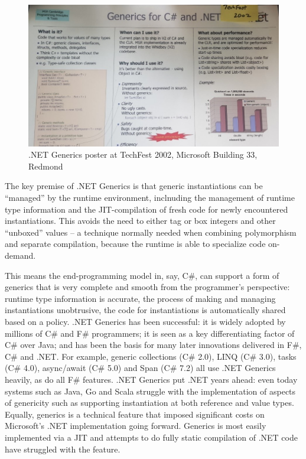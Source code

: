 \documentclass[acmsmall]{acmart}\settopmatter{}
\begin{document}
\begin{figure}

  \includegraphics[width=0.8\linewidth]{fig1.jpg}
  \caption{.NET Generics poster at TechFest 2002, Microsoft Building 33, Redmond}
  \label{fig:fig1}

\end{figure}

The key premise of .NET Generics is that generic instantiations can be “managed” by the runtime environment, inclnuding the management of runtime type information
and the JIT-compilation of fresh code for newly encountered instantiations.  This avoids the need to either tag or box integers and other “unboxed” values – a technique
normally needed when combining polymorphism and separate compilation, because the runtime is able to specialize code on-demand.

This means the end-programming model in, say, C\#, can support a form of generics that is very complete and smooth from the programmer’s perspective:
runtime type information is accurate, the process of making and managing instantiations unobtrusive, the code for instantiations is automatically shared based on a
policy. .NET Generics has been successful: it is widely adopted by millions of C\# and F\# programmers; it is seen as a key differentiating factor of C\# over Java; and
has been the basis for many later innovations delivered in F\#, C\# and .NET. For example, generic collections (C\# 2.0), LINQ (C\# 3.0), tasks (C\# 4.0),
async/await (C\# 5.0) and Span (C\# 7.2) all use .NET Generics heavily, as do all F\# features. .NET Generics put .NET years ahead: even today systems such as
Java, Go and Scala struggle with the implementation of aspects of genericity such as supporting instantiation at both reference and value types.  Equally, generics is
a technical feature that imposed significant costs on Microsoft’s .NET implementation going forward. Generics is most easily implemented via a JIT and attempts to do fully
static compilation of .NET code have struggled with the feature.
\end{document}
